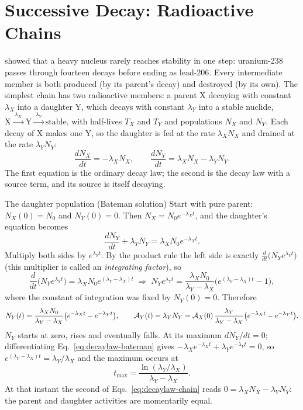 \section{Successive Decay: Radioactive Chains}\label{sec:decaylaw-chains}

 showed that a heavy nucleus rarely reaches stability in one step: uranium-238 passes
through fourteen decays before ending as lead-206. Every intermediate member is both produced (by its
parent's decay) and destroyed (by its own). The simplest chain has two radioactive members: a parent X
decaying with constant $\lambda_X$ into a daughter Y, which decays with constant $\lambda_Y$ into a
stable nuclide,
$\mathrm{X}\xrightarrow{\;\lambda_X\;}\mathrm{Y}\xrightarrow{\;\lambda_Y\;}\text{stable}$, with
half-lives $T_X$ and $T_Y$ and populations $N_X$ and $N_Y$. Each decay of X makes one Y, so the
daughter is fed at the rate $\lambda_XN_X$ and drained at the rate $\lambda_YN_Y$:
\begin{equation}\label{eq:decaylaw-chain}
\frac{dN_X}{dt}=-\lambda_XN_X,\qquad\frac{dN_Y}{dt}=\lambda_XN_X-\lambda_YN_Y .
\end{equation}
The first equation is the ordinary decay law; the second is the decay law with a source term, and its
source is itself decaying.

\begin{derivbox}{The daughter population (Bateman solution)}
Start with pure parent: $N_X(0)=N_0$ and $N_Y(0)=0$. Then $N_X=N_0e^{-\lambda_Xt}$, and the daughter's
equation becomes
\[
\frac{dN_Y}{dt}+\lambda_YN_Y=\lambda_XN_0e^{-\lambda_Xt}.
\]
Multiply both sides by $e^{\lambda_Yt}$. By the product rule the left side is exactly
$\frac{d}{dt}\big(N_Ye^{\lambda_Yt}\big)$ (this multiplier is called an \emph{integrating factor}), so
\[
\frac{d}{dt}\big(N_Ye^{\lambda_Yt}\big)=\lambda_XN_0e^{(\lambda_Y-\lambda_X)t}
\;\Longrightarrow\;
N_Ye^{\lambda_Yt}=\frac{\lambda_XN_0}{\lambda_Y-\lambda_X}\big(e^{(\lambda_Y-\lambda_X)t}-1\big),
\]
where the constant of integration was fixed by $N_Y(0)=0$. Therefore
\begin{equation}\label{eq:decaylaw-bateman}
N_Y(t)=\frac{\lambda_X N_0}{\lambda_Y-\lambda_X}\big(e^{-\lambda_Xt}-e^{-\lambda_Yt}\big),\qquad
\mathcal{A}_Y(t)=\lambda_YN_Y=\mathcal{A}_X(0)\,\frac{\lambda_Y}{\lambda_Y-\lambda_X}\big(e^{-\lambda_Xt}-e^{-\lambda_Yt}\big).
\end{equation}
$N_Y$ starts at zero, rises and eventually falls. At its maximum $dN_Y/dt=0$; differentiating
Eq.~\eqref{eq:decaylaw-bateman} gives $-\lambda_Xe^{-\lambda_Xt}+\lambda_Ye^{-\lambda_Yt}=0$, so
$e^{(\lambda_Y-\lambda_X)t}=\lambda_Y/\lambda_X$ and the maximum occurs at
\begin{equation}\label{eq:decaylaw-tmax}
t_{\max}=\frac{\ln(\lambda_Y/\lambda_X)}{\lambda_Y-\lambda_X}.
\end{equation}
At that instant the second of Eqs.~\eqref{eq:decaylaw-chain} reads $0=\lambda_XN_X-\lambda_YN_Y$: the
parent and daughter activities are momentarily equal.
\end{derivbox}

